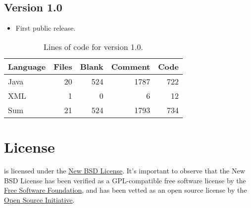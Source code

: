 \documentclass[a4paper,twoside,12pt]{memoir}
\begin{document}
\subsection*{Version 1.0}

\begin{itemize}
\item[\newfeature] First public release.
\end{itemize}

{\renewcommand{\arraystretch}{1.5}
\begin{table}[ht]
\centering
\caption{Lines of code for version 1.0.}
\begin{tabular}{lrrrr}
\hline
\textbf{Language} & \textbf{Files} & \textbf{Blank} & \textbf{Comment} & \textbf{Code}\\
\hline
\hline
Java & 20 & 524 & 1787 & 722\\
XML & 1 & 0 & 6 & 12\\
\hline
Sum & 21 & 524 & 1793 & 734\\
\hline
\end{tabular}
\label{tab:locarara10}
\end{table}}

\cleardoublepage

\section*{License}
\label{sec:license}

\arara is licensed under the 
\href{http://www.opensource.org/licenses/bsd-license.php}{New BSD License}. It's
important to observe that the New BSD License has been verified as a 
GPL-compatible free software license by the 
\href{http://www.fsf.org/}{Free Software Foundation}, and has been vetted as an 
open source license by the 
\href{http://www.opensource.org/}{Open Source Initiative}.

\vfill
\end{document}
